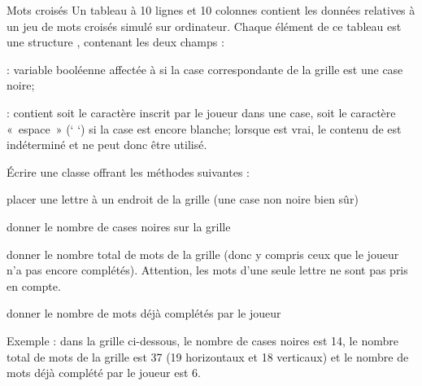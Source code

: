 \begin{Exercice}{Mots croisés}
	Un tableau  à 10 lignes et 10 colonnes contient les données
	relatives à un jeu de mots croisés simulé sur ordinateur. Chaque
	élément de ce tableau est une structure ,
	contenant les deux champs :

	\begin{liste}
		\item 
			 : variable booléenne affectée à
			 si la case correspondante de la grille est une
			case noire;
		\item 
			 : contient soit le caractère inscrit par le
			joueur dans une case, soit le caractère «~espace~» (‘ ‘) si la case est
			encore blanche; lorsque  est vrai, le contenu
			de  est indéterminé et ne peut donc être
			utilisé. 
	\end{liste}
	
	Écrire une classe  offrant les méthodes
	suivantes :

	\begin{liste}
		\item 
			placer une lettre à un endroit de la grille (une case non noire bien
			sûr)
		\item 
			donner le nombre de cases noires sur la grille
		\item 
			donner le nombre total de mots de la grille (donc y compris ceux que le
			joueur n’a pas encore complétés). Attention, les mots
			d'une seule lettre ne sont pas pris en compte.
		\item 
			donner le nombre de mots déjà complétés par le joueur
	\end{liste}

	Exemple : dans la grille ci-dessous, le nombre de cases noires est 14, le
	nombre total de mots de la grille est 37 (19 horizontaux et 18
	verticaux) et le nombre de mots déjà complété par le joueur est 6.
	

\end{Exercice}
